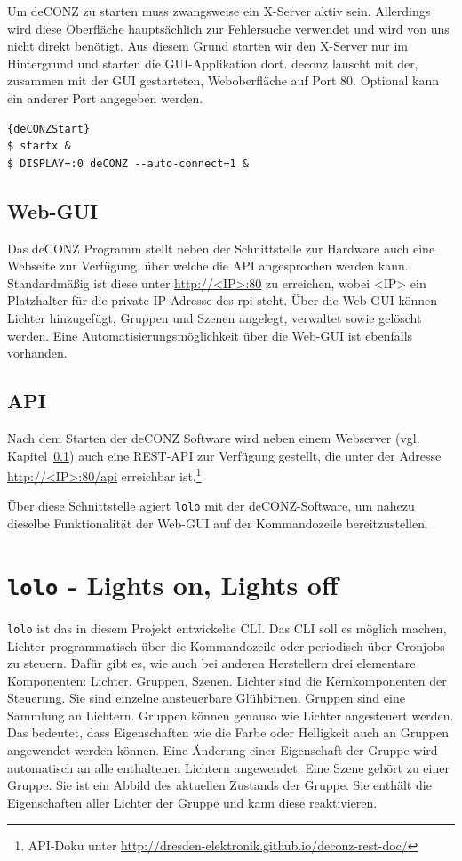 \documentclass[a4paper,12pt]{article}
\begin{document}
Um deCONZ zu starten muss zwangsweise ein X-Server aktiv sein. Allerdings wird
diese Oberfläche hauptsächlich zur Fehlersuche verwendet und wird von uns nicht
direkt benötigt. Aus diesem Grund starten wir den X-Server nur im Hintergrund
und starten die GUI-Applikation dort. \acrshort{deconz} lauscht mit der,
zusammen mit der GUI gestarteten, Weboberfläche auf Port 80. Optional kann ein
anderer Port angegeben werden.

\begin{lstlisting}[caption=deCONZ starten]{deCONZStart}
$ startx &
$ DISPLAY=:0 deCONZ --auto-connect=1 &
\end{lstlisting}

\subsection{Web-GUI}
\label{ss:webgui}

Das deCONZ Programm stellt neben der Schnittstelle zur Hardware auch eine
Webseite zur Verfügung, über welche die API angesprochen werden kann.
Standardmäßig ist diese unter \url{http://<IP>:80} zu erreichen, wobei <IP> ein
Platzhalter für die private IP-Adresse des \gls{rpi} steht. Über die Web-GUI
können Lichter hinzugefügt, Gruppen und Szenen angelegt, verwaltet sowie
gelöscht werden. Eine Automatisierungsmöglichkeit über die Web-GUI ist
ebenfalls vorhanden.

\subsection{API}

Nach dem Starten der deCONZ Software wird neben einem Webserver (vgl.
Kapitel~\ref{ss:webgui}) auch eine REST-API zur Verfügung gestellt, die unter
der Adresse \url{http://<IP>:80/api} erreichbar ist.\footnote{API-Doku unter
\url{http://dresden-elektronik.github.io/deconz-rest-doc/}}

Über diese Schnittstelle agiert \texttt{lolo} mit der deCONZ-Software, um
nahezu dieselbe Funktionalität der Web-GUI auf der Kommandozeile
bereitzustellen.

\newpage

\section{\texttt{lolo} - Lights on, Lights off}
\label{lolo}

\texttt{lolo} ist das in diesem Projekt entwickelte CLI. Das CLI soll es möglich machen,
Lichter programmatisch über die Kommandozeile oder periodisch über Cronjobs zu
steuern. Dafür gibt es, wie auch bei anderen Herstellern drei elementare
Komponenten: Lichter, Gruppen, Szenen. Lichter sind die Kernkomponenten der
Steuerung. Sie sind einzelne ansteuerbare Glühbirnen. Gruppen sind eine
Sammlung an Lichtern. Gruppen können genauso wie Lichter angesteuert werden.
Das bedeutet, dass Eigenschaften wie die Farbe oder Helligkeit auch an Gruppen
angewendet werden können. Eine Änderung einer Eigenschaft der Gruppe wird
automatisch an alle enthaltenen Lichtern angewendet. Eine Szene gehört zu einer
Gruppe. Sie ist ein Abbild des aktuellen Zustands der Gruppe. Sie enthält die
Eigenschaften aller Lichter der Gruppe und kann diese reaktivieren.
\end{document}
